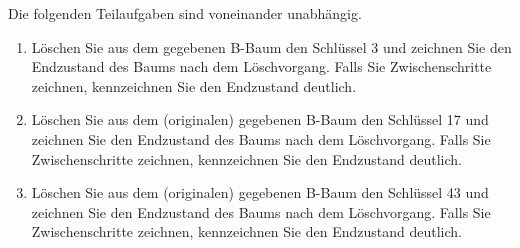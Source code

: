 \documentclass{lehramt-informatik-aufgabe}
\begin{document}
\begin{enumerate}
Die folgenden Teilaufgaben sind voneinander unabhängig.
\begin{enumerate}

%

\item Löschen Sie aus dem gegebenen B-Baum den Schlüssel 3 und zeichnen
Sie den Endzustand des Baums nach dem Löschvorgang. Falls Sie
Zwischenschritte zeichnen, kennzeichnen Sie den Endzustand deutlich.

%

\item Löschen Sie aus dem (originalen) gegebenen B-Baum den Schlüssel 17
und zeichnen Sie den Endzustand des Baums nach dem Löschvorgang. Falls
Sie Zwischenschritte zeichnen, kennzeichnen Sie den Endzustand deutlich.

%

\item Löschen Sie aus dem (originalen) gegebenen B-Baum den Schlüssel 43
und zeichnen Sie den Endzustand des Baums nach dem Löschvorgang. Falls
Sie Zwischenschritte zeichnen, kennzeichnen Sie den Endzustand deutlich.
\end{enumerate}
\end{enumerate}
\end{document}
